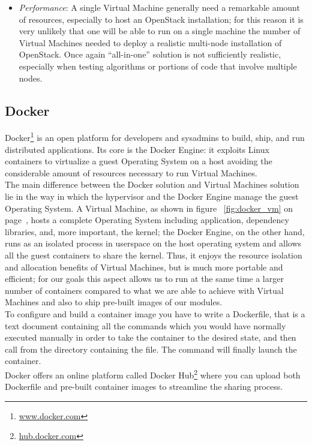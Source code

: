 \begin{itemize}
\item \textit{Performance}: A single Virtual Machine generally need a remarkable amount of resources, especially to host an OpenStack installation; for this reason it is very unlikely that one will be able to run on a single machine the number of Virtual Machines needed to deploy a realistic multi-node installation of OpenStack. Once again ``all-in-one'' solution is not sufficiently realistic, especially when testing algorithms or portions of code that involve multiple nodes.
\end{itemize}


\subsection{Docker}
\label{sub:sota_docker}
Docker\footnote{\url{www.docker.com}} is an open platform for developers and sysadmins to build, ship, and run distributed applications. Its core is the Docker Engine: it exploits Linux containers to virtualize a guest Operating System on a host avoiding the considerable amount of resources necessary to run Virtual Machines.\\
The main difference between the Docker solution and Virtual Machines solution lie in the way in which the hypervisor and the Docker Engine manage the guest Operating System. A Virtual Machine, as shown in figure ~\ref{fig:docker_vm} on page~\pageref{fig:docker_vm}, hosts a complete Operating System including application, dependency libraries, and, more important, the kernel; the Docker Engine, on the other hand, runs as an isolated process in userspace on the host operating system and allows all the guest containers to share the kernel. Thus, it enjoys the resource isolation and allocation benefits of Virtual Machines, but is much more portable and efficient; for our goals this aspect allows us to run at the same time a larger number of containers compared to what we are able to achieve with Virtual Machines and also to ship pre-built images of our modules.\\
To configure and build a container image you have to write a Dockerfile, that is a text document containing all the commands which you would have normally executed manually in order to take the container to the desired state, and then call  from the directory containing the file. The command  will finally launch the container.\\
Docker offers an online platform called Docker Hub\footnote{\url{hub.docker.com}} where you can upload both Dockerfile and pre-built container images to streamline the sharing process.
    
